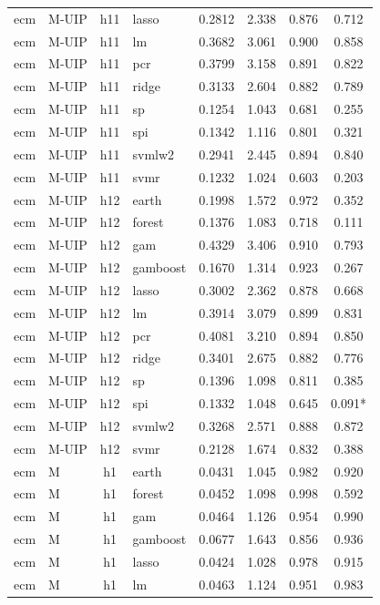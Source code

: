 \begin{ThreePartTable}
\begin{longtable}[t]{llclcccc}
ecm & M-UIP & h11 & lasso & 0.2812 & 2.338 & 0.876 & 0.712\\
ecm & M-UIP & h11 & lm & 0.3682 & 3.061 & 0.900 & 0.858\\
ecm & M-UIP & h11 & pcr & 0.3799 & 3.158 & 0.891 & 0.822\\
ecm & M-UIP & h11 & ridge & 0.3133 & 2.604 & 0.882 & 0.789\\
ecm & M-UIP & h11 & sp & 0.1254 & 1.043 & 0.681 & 0.255\\
ecm & M-UIP & h11 & spi & 0.1342 & 1.116 & 0.801 & 0.321\\
ecm & M-UIP & h11 & svmlw2 & 0.2941 & 2.445 & 0.894 & 0.840\\
ecm & M-UIP & h11 & svmr & 0.1232 & 1.024 & 0.603 & 0.203\\
\addlinespace
ecm & M-UIP & h12 & earth & 0.1998 & 1.572 & 0.972 & 0.352\\
ecm & M-UIP & h12 & forest & 0.1376 & 1.083 & 0.718 & 0.111\\
ecm & M-UIP & h12 & gam & 0.4329 & 3.406 & 0.910 & 0.793\\
ecm & M-UIP & h12 & gamboost & 0.1670 & 1.314 & 0.923 & 0.267\\
ecm & M-UIP & h12 & lasso & 0.3002 & 2.362 & 0.878 & 0.668\\
ecm & M-UIP & h12 & lm & 0.3914 & 3.079 & 0.899 & 0.831\\
ecm & M-UIP & h12 & pcr & 0.4081 & 3.210 & 0.894 & 0.850\\
ecm & M-UIP & h12 & ridge & 0.3401 & 2.675 & 0.882 & 0.776\\
ecm & M-UIP & h12 & sp & 0.1396 & 1.098 & 0.811 & 0.385\\
ecm & M-UIP & h12 & spi & 0.1332 & 1.048 & 0.645 & 0.091*\\
ecm & M-UIP & h12 & svmlw2 & 0.3268 & 2.571 & 0.888 & 0.872\\
ecm & M-UIP & h12 & svmr & 0.2128 & 1.674 & 0.832 & 0.388\\
\addlinespace
ecm & M & h1 & earth & 0.0431 & 1.045 & 0.982 & 0.920\\
ecm & M & h1 & forest & 0.0452 & 1.098 & 0.998 & 0.592\\
ecm & M & h1 & gam & 0.0464 & 1.126 & 0.954 & 0.990\\
ecm & M & h1 & gamboost & 0.0677 & 1.643 & 0.856 & 0.936\\
ecm & M & h1 & lasso & 0.0424 & 1.028 & 0.978 & 0.915\\
ecm & M & h1 & lm & 0.0463 & 1.124 & 0.951 & 0.983\\

\end{longtable}
\end{ThreePartTable}
